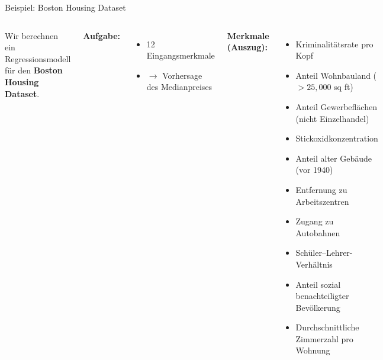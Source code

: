 \begin{frame}{Beispiel: Boston Housing Dataset}

\footnotesize
    
    \begin{columns}

Wir berechnen ein Regressionsmodell für den \textbf{Boston Housing Dataset}.

\textbf{Aufgabe:}
\begin{itemize}
\item 12 Eingangsmerkmale
\item $\rightarrow$ Vorhersage des Medianpreises
\end{itemize}
\centering
{}

\textbf{Merkmale (Auszug):}
\begin{itemize}
\item Kriminalitätsrate pro Kopf
\item Anteil Wohnbauland ($> 25{,}000$ sq ft)
\item Anteil Gewerbeflächen (nicht Einzelhandel)
\item Stickoxidkonzentration
\item Anteil alter Gebäude (vor 1940)
\item Entfernung zu Arbeitszentren
\item Zugang zu Autobahnen
\item Schüler--Lehrer-Verhältnis
\item Anteil sozial benachteiligter Bevölkerung
\item Durchschnittliche Zimmerzahl pro Wohnung
\end{itemize}
\end{columns}
\end{frame}

